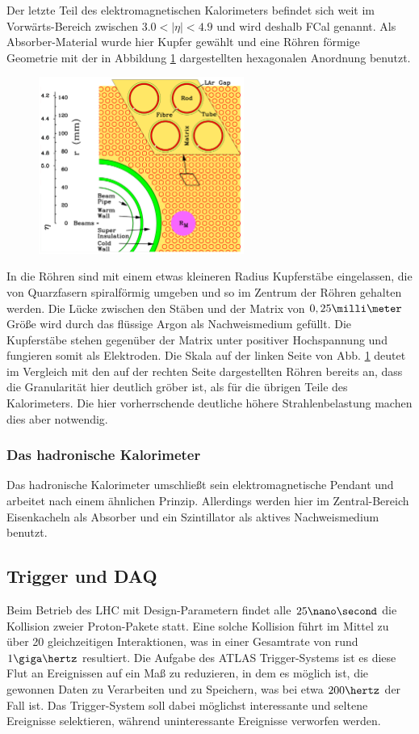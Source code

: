 Der letzte Teil des elektromagnetischen Kalorimeters befindet sich weit im
Vorwärts-Bereich zwischen $3.0<|\eta|<4.9$ und wird deshalb \acf{FCal} genannt.
Als Absorber-Material wurde hier Kupfer gewählt und eine Röhren förmige
Geometrie mit der in Abbildung \ref{fig:fcal} dargestellten hexagonalen
Anordnung benutzt.
\begin{figure}[h]
    \centering
    \includegraphics[width=0.6\textwidth]{img/fcal}
    \caption[]{}
    \label{fig:fcal}
\end{figure}
In die Röhren sind mit einem etwas kleineren Radius Kupferstäbe eingelassen,
die von Quarzfasern spiralförmig umgeben und so im Zentrum der Röhren gehalten
werden. Die Lücke zwischen den Stäben und der Matrix von $0,25\milli\meter$
Größe wird durch das flüssige Argon als Nachweismedium gefüllt. Die Kupferstäbe
stehen gegenüber der Matrix unter positiver Hochspannung und fungieren somit
als Elektroden. Die Skala auf der linken Seite von Abb. \ref{fig:fcal} deutet
im Vergleich mit den auf der rechten Seite dargestellten Röhren bereits an,
dass die Granularität hier deutlich gröber ist, als für die übrigen Teile des
Kalorimeters. Die hier vorherrschende deutliche höhere Strahlenbelastung machen
dies aber notwendig.

\subsubsection{Das hadronische Kalorimeter}
Das hadronische Kalorimeter umschließt sein elektromagnetische Pendant und
arbeitet nach einem ähnlichen Prinzip. Allerdings werden hier im
Zentral-Bereich Eisenkacheln als Absorber und ein Szintillator als aktives
Nachweismedium benutzt.



\subsection{Trigger und DAQ}
\label{trigger_daq}
Beim Betrieb des \ac{LHC} mit Design-Parametern findet alle $25\nano\second$
die Kollision zweier Proton-Pakete statt. Eine solche Kollision führt im Mittel
zu über 20 gleichzeitigen Interaktionen, was in einer Gesamtrate von rund
$1\giga\hertz$ resultiert. Die Aufgabe des ATLAS Trigger-Systems ist es diese
Flut an Ereignissen auf ein Maß zu reduzieren, in dem es möglich ist, die
gewonnen Daten zu Verarbeiten und zu Speichern, was bei etwa $200\hertz$ der
Fall ist. Das Trigger-System soll dabei möglichst interessante und seltene
Ereignisse selektieren, während uninteressante Ereignisse verworfen werden.

